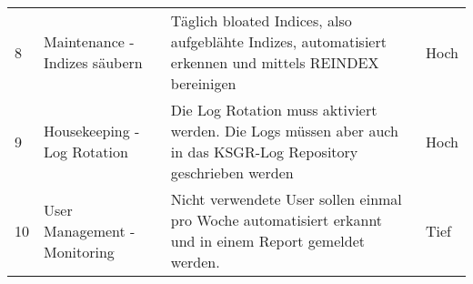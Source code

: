 \begin{table}[H]
{\begin{tabular}{@{}llll@{}}
8            & Maintenance - Indizes säubern                     & Täglich bloated Indices, also aufgeblähte Indizes, automatisiert erkennen und mittels REINDEX bereinigen                                                                                                                                                                                                                                                                                                                                                                                                                                                                                                                                                                                                                                                                                                                                                                             & Hoch               \\
9            & Housekeeping - Log Rotation                       & Die Log Rotation muss aktiviert werden. Die Logs müssen aber auch in das KSGR-Log Repository geschrieben werden                                                                                                                                                                                                                                                                                                                                                                                                                                                                                                                                                                                                                                                                                                                                                                      & Hoch               \\
10           & User Management - Monitoring                      & Nicht verwendete User sollen einmal pro Woche automatisiert erkannt und in einem Report gemeldet werden.                                                                                                                                                                                                                                                                                                                                                                                                                                                                                                                                                                                                                                                                                                                                                                             & Tief               \\

\end{tabular}}
\end{table}
